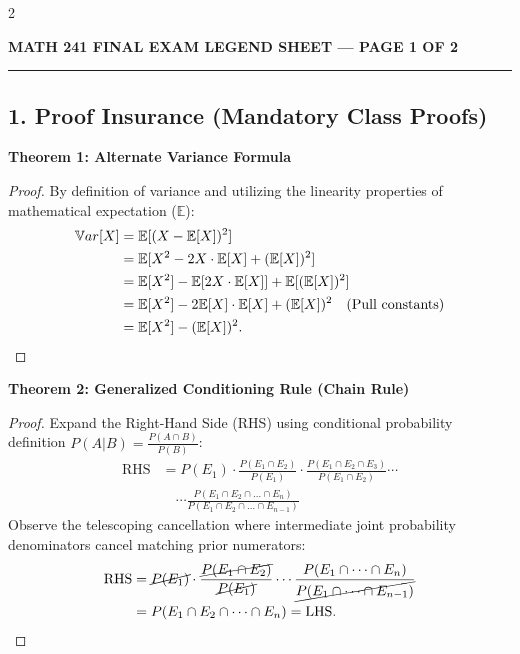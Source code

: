 \documentclass[9pt,landscape]{article}
\newcommand{\Var}{\mathbb{V}ar}
\newcommand{\E}{\mathbb{E}}
\begin{document}
\begin{multicols*}{2} %

\begin{center}
    \large\textbf{\color{red}MATH 241 FINAL EXAM LEGEND SHEET --- PAGE 1 OF 2}
\end{center}
\vskip 1pt
\hrule
\vskip 4pt

\subsection*{1. Proof Insurance (Mandatory Class Proofs)}

\textbf{Theorem 1: Alternate Variance Formula}
\begin{proof}
By definition of variance and utilizing the linearity properties of mathematical expectation ($\E$):
\begin{align*}
\Var[X] &= \E[(X - \E[X])^2] \\
&= \E[X^2 - 2X \cdot \E[X] + (\E[X])^2] \\
&= \E[X^2] - \E[2X \cdot \E[X]] + \E[(\E[X])^2] \\
&= \E[X^2] - 2\E[X]\cdot \E[X] + (\E[X])^2 \quad \text{(Pull constants)} \\
&= \E[X^2] - (\E[X])^2. \qedhere
\end{align*}
\end{proof}

\textbf{Theorem 2: Generalized Conditioning Rule (Chain Rule)}
\begin{proof}
Expand the Right-Hand Side (RHS) using conditional probability definition $P(A|B) = \frac{P(A \cap B)}{P(B)}$:
\begin{align*}
\text{RHS} &= P(E_1) \cdot \frac{P(E_1 \cap E_2)}{P(E_1)} \cdot \frac{P(E_1 \cap E_2 \cap E_3)}{P(E_1 \cap E_2)} \cdots \\
& \quad \cdots \frac{P(E_1 \cap E_2 \cap \dots \cap E_n)}{P(E_1 \cap E_2 \cap \dots \cap E_{n-1})}
\end{align*}
Observe the telescoping cancellation where intermediate joint probability denominators cancel matching prior numerators:
\begin{align*}
\text{RHS} &= \cancel{P(E_1)} \cdot \frac{\cancel{P(E_1 \cap E_2)}}{\cancel{P(E_1)}} \cdots \frac{P(E_1 \cap \dots \cap E_n)}{\cancel{P(E_1 \cap \dots \cap E_{n-1})}} \\
&= P(E_1 \cap E_2 \cap \dots \cap E_n) = \text{LHS}. \qedhere
\end{align*}
\end{proof}

\end{multicols*}
\end{document}
